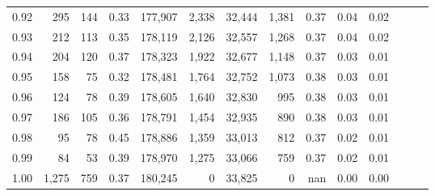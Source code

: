 \begin{tabular}{rrrrrrrrrrrrrr}
0.92 &    295 &  144 &  0.33 &  177,907 &    2,338 &  32,444 &   1,381 &  0.37 &  0.04 &      0.02 \\
0.93 &    212 &  113 &  0.35 &  178,119 &    2,126 &  32,557 &   1,268 &  0.37 &  0.04 &      0.02 \\
0.94 &    204 &  120 &  0.37 &  178,323 &    1,922 &  32,677 &   1,148 &  0.37 &  0.03 &      0.01 \\
0.95 &    158 &   75 &  0.32 &  178,481 &    1,764 &  32,752 &   1,073 &  0.38 &  0.03 &      0.01 \\
0.96 &    124 &   78 &  0.39 &  178,605 &    1,640 &  32,830 &     995 &  0.38 &  0.03 &      0.01 \\
0.97 &    186 &  105 &  0.36 &  178,791 &    1,454 &  32,935 &     890 &  0.38 &  0.03 &      0.01 \\
0.98 &     95 &   78 &  0.45 &  178,886 &    1,359 &  33,013 &     812 &  0.37 &  0.02 &      0.01 \\
0.99 &     84 &   53 &  0.39 &  178,970 &    1,275 &  33,066 &     759 &  0.37 &  0.02 &      0.01 \\
1.00 &  1,275 &  759 &  0.37 &  180,245 &        0 &  33,825 &       0 &   nan &  0.00 &      0.00 \\
\bottomrule
\end{tabular}

